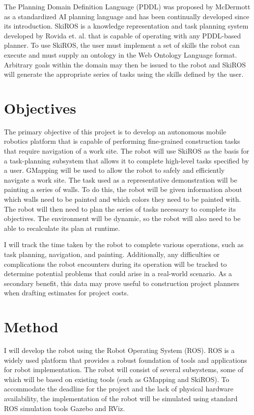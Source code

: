 \documentclass[12pt]{article}
\begin{document}
    The Planning Domain Definition Language (PDDL) was proposed by McDermott \cite{mcdermott20001998} as a standardized AI planning language and has been continually developed since its introduction. SkiROS is a knowledge representation and task planning system developed by Rovida et. al. \cite{rovida2017skiros} that is capable of operating with any PDDL-based planner. To use SkiROS, the user must implement a set of skills the robot can execute and must supply an ontology in the Web Ontology Language format. Arbitrary goals within the domain may then be issued to the robot and SkiROS will generate the appropriate series of tasks using the skills defined by the user.

    \section{Objectives}
    The primary objective of this project is to develop an autonomous mobile robotics platform that is capable of performing fine-grained construction tasks that require navigation of a work site. The robot will use SkiROS as the basis for a task-planning subsystem that allows it to complete high-level tasks specified by a user. GMapping will be used to allow the robot to safely and efficiently navigate a work site. The task used as a representative demonstration will be painting a series of walls. To do this, the robot will be given information about which walls need to be painted and which colors they need to be painted with. The robot will then need to plan the series of tasks necessary to complete its objectives. The environment will be dynamic, so the robot will also need to be able to recalculate its plan at runtime.

    I will track the time taken by the robot to complete various operations, such as task planning, navigation, and painting. Additionally, any difficulties or complications the robot encounters during its operation will be tracked to determine potential problems that could arise in a real-world scenario. As a secondary benefit, this data may prove useful to construction project planners when drafting estimates for project costs.

    \section{Method}
    I will develop the robot using the Robot Operating System (ROS). ROS is a widely used platform that provides a robust foundation of tools and applications for robot implementation. The robot will consist of several subsystems, some of which will be based on existing tools (such as GMapping and SkiROS). To accommodate the deadline for the project and the lack of physical hardware availability, the implementation of the robot will be simulated using standard ROS simulation tools Gazebo and RViz.
\end{document}
